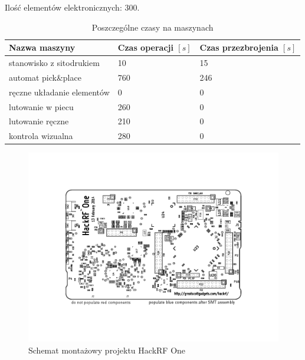 \breakparagraph{}
Ilość elementów elektronicznych: 300.

\begin{table}[H]
	\centering
	\caption{Poszczególne czasy na maszynach}
	\begin{tabular}{lll}
		\toprule
		Nazwa maszyny                 & Czas operacji $[s]$ & Czas przezbrojenia $[s]$ \\
		\midrule
		stanowisko z sitodrukiem      & 10                  & 15                       \\
		automat pick\&place           & 760                 & 246                      \\
		ręczne układanie elementów & 0                   & 0                        \\
		lutowanie w piecu             & 260                 & 0                        \\
		lutowanie ręczne             & 210                 & 0                        \\
		kontrola wizualna             & 280                 & 0                        \\
		\bottomrule
	\end{tabular}
\end{table}

\begin{figure}[H]
	\centering
	\includegraphics[scale=0.9,clip, trim=1.5cm 2.5cm 1.5cm 2.5cm]{chapters/chapter5/hackrf-one-assembly.pdf}
	\caption{Schemat montażowy projektu HackRF One}
	\label{hackrf}
\end{figure}

\newpage
